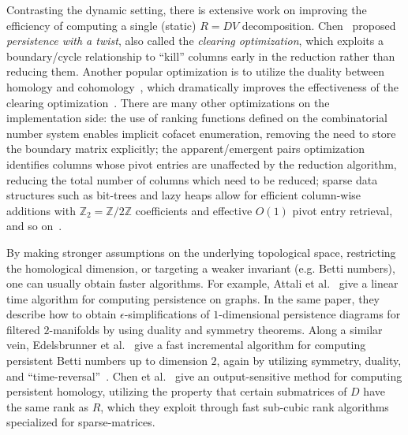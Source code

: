 \documentclass[sn-mathphys]{sn-jnl}
\begin{document}
Contrasting the dynamic setting, there is extensive work  on improving the efficiency of computing a single (static) $R = DV$ decomposition. Chen~\cite{chen2011persistent} proposed \emph{persistence with a twist}, also called the \emph{clearing optimization}, which exploits a boundary/cycle relationship to ``kill'' columns early in the reduction rather than reducing them. 
Another popular optimization is to utilize the duality between   homology and cohomology~\cite{de2011dualities}, which dramatically improves the effectiveness of the clearing optimization~\cite{bauer2021ripser}. 
There are many other optimizations on the implementation side: the use of ranking functions defined on the combinatorial number system enables implicit cofacet enumeration, removing the need to store the boundary matrix explicitly; the apparent/emergent pairs optimization identifies columns whose pivot entries are unaffected by the reduction algorithm, reducing the total number of columns which need to be reduced; sparse data structures such as bit-trees and lazy heaps allow for efficient column-wise additions with $\mathbb{Z}_2 = \mathbb{Z}/2\mathbb{Z}$ coefficients and effective $O(1)$ pivot entry retrieval, and so on~\cite{bauer2021ripser, bauer2017phat}. 

By making stronger assumptions on the underlying topological space, restricting the homological dimension, or targeting  a weaker invariant (e.g. Betti numbers), one can usually obtain faster algorithms.
For example, Attali et al.~\cite{attali2009persistence} give a linear time algorithm for computing persistence on graphs.
In the same paper, they describe how to obtain $\epsilon$-simplifications of $1$-dimensional persistence diagrams for filtered $2$-manifolds by using duality and symmetry theorems. 
Along a similar vein, Edelsbrunner et al.~\cite{edelsbrunner2000topological} give a fast incremental algorithm for computing persistent Betti numbers up to dimension $2$, again by utilizing symmetry, duality, and ``time-reversal''~\cite{delfinado1995incremental}. Chen et al.~\cite{chen2013output} give an output-sensitive method for computing persistent homology,  utilizing the property that certain submatrices of  $D$ have the same rank as  $R$, which they exploit through fast sub-cubic rank algorithms specialized for sparse-matrices.  
\end{document}
